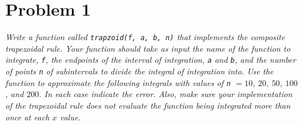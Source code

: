 \documentclass[12pt]{article}
\begin{document}
\section*{Problem 1}
{\it Write a function called {\tt trapzoid(f, a, b, n)} that implements the composite trapezoidal rule.  Your function should take as input the name of the function to integrate, {\tt f}, the endpoints of the interval of integration, {\tt a} and {\tt b}, and the number of points {\tt n} of subintervals to divide the integral of integration into.  Use the function to approximate the following integrals with values of {\tt n} $= 10$, $20$, $50$, $100$, and $200$.  In each case indicate the error.  Also, make sure your implementation of the trapezoidal rule does not evaluate the function being integrated more than once at each $x$ value.}
\end{document}
